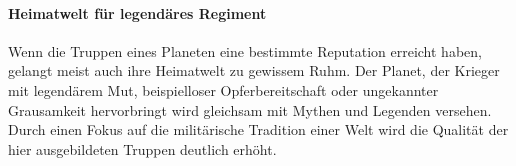 \documentclass[11pt, a4paper]{article}
\begin{document}
\paragraph{Heimatwelt für legendäres Regiment}
Wenn die Truppen eines Planeten eine bestimmte Reputation erreicht haben, gelangt meist auch ihre Heimatwelt
zu gewissem Ruhm. Der Planet, der Krieger mit legendärem Mut, beispielloser Opferbereitschaft oder ungekannter
Grausamkeit hervorbringt wird gleichsam mit Mythen und Legenden versehen. Durch einen Fokus auf die 
militärische Tradition einer Welt wird die Qualität der hier ausgebildeten Truppen deutlich erhöht.
\end{document}
